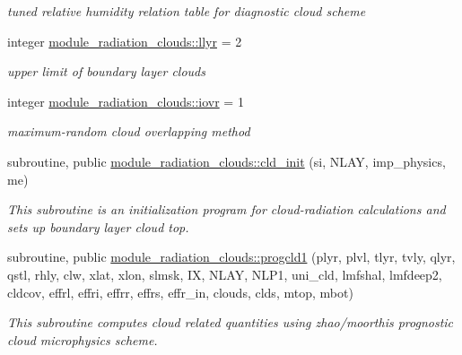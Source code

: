 \begin{DoxyCompactItemize}
\begin{DoxyCompactList}\small\item\em tuned relative humidity relation table for diagnostic cloud scheme \end{DoxyCompactList}\item 
\mbox{\label{group__module__radiation__clouds_ga3390b20d42afccb3ec569a5b69a93f6e}} 
integer \hyperlink{group__module__radiation__clouds_ga3390b20d42afccb3ec569a5b69a93f6e}{module\+\_\+radiation\+\_\+clouds\+::llyr} = 2
\begin{DoxyCompactList}\small\item\em upper limit of boundary layer clouds \end{DoxyCompactList}\item 
\mbox{\label{group__module__radiation__clouds_ga5cfafee79e8cf066ddd8440cdfdc41a0}} 
integer \hyperlink{group__module__radiation__clouds_ga5cfafee79e8cf066ddd8440cdfdc41a0}{module\+\_\+radiation\+\_\+clouds\+::iovr} = 1
\begin{DoxyCompactList}\small\item\em maximum-\/random cloud overlapping method \end{DoxyCompactList}\end{DoxyCompactItemize}
\begin{DoxyCompactItemize}
\item 
subroutine, public \hyperlink{group__module__radiation__clouds_ga0e1ee94c9ca85849a219803325a61184}{module\+\_\+radiation\+\_\+clouds\+::cld\+\_\+init} (si, N\+L\+AY, imp\+\_\+physics, me)
\begin{DoxyCompactList}\small\item\em This subroutine is an initialization program for cloud-\/radiation calculations and sets up boundary layer cloud top. \end{DoxyCompactList}\end{DoxyCompactItemize}
\begin{DoxyCompactItemize}
\item 
subroutine, public \hyperlink{group__module__radiation__clouds_gafa23f5bc69fa713abfa32939fd96ade8}{module\+\_\+radiation\+\_\+clouds\+::progcld1} (plyr, plvl, tlyr, tvly, qlyr, qstl, rhly, clw, xlat, xlon, slmsk, IX, N\+L\+AY, N\+L\+P1, uni\+\_\+cld, lmfshal, lmfdeep2, cldcov, effrl, effri, effrr, effrs, effr\+\_\+in, clouds, clds, mtop, mbot)
\begin{DoxyCompactList}\small\item\em This subroutine computes cloud related quantities using zhao/moorthi\textquotesingle{}s prognostic cloud microphysics scheme. \end{DoxyCompactList}\end{DoxyCompactItemize}
